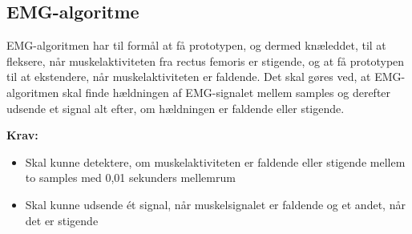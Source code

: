 \subsection{EMG-algoritme}\label{sec:krav_emg_algo}
EMG-algoritmen har til formål at få prototypen, og dermed knæleddet, til at fleksere, når muskelaktiviteten fra rectus femoris er stigende, og at få prototypen til at ekstendere, når muskelaktiviteten er faldende. Det skal gøres ved, at EMG-algoritmen skal finde hældningen af EMG-signalet mellem samples og derefter udsende et signal alt efter, om  hældningen er faldende eller stigende. 

\vspace{3mm}
\textbf{Krav:}
\begin{itemize}
\item Skal kunne detektere, om muskelaktiviteten er faldende eller stigende mellem to samples med 0,01 sekunders mellemrum
\item Skal kunne udsende ét signal, når muskelsignalet er faldende og et andet, når det er stigende
\end{itemize}


